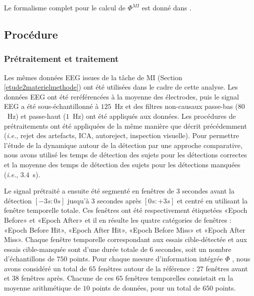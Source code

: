 Le formalisme complet pour le calcul de $\Phi^{MI}$ est donné dans \cite{kitazono2018efficient}. 

\subsection{Procédure}
\label{procedureiit}

\subsubsection{Prétraitement et traitement}
\label{pretraitementiit}

Les mêmes données EEG issues de la tâche de MI (Section \ref{etude2materielmethode}) ont été utilisées dans le cadre de cette analyse. 
Les données EEG ont été reréférencées à la moyenne des électrodes, puis le signal EEG a été sous-échantillonné à $125$~Hz et des filtres non-causaux passe-bas ($80$~Hz) et passe-haut ($1$~Hz) ont été appliqués aux données. 
Les procédures de prétraitements ont été appliquées de la même manière que décrit précédemment (\textit{i.e.}, rejet des artefacts, ICA, autoreject, inspection visuelle). 
Pour permettre l'étude de la dynamique autour de la détection par une approche comparative, nous avons utilisé les temps de détection des sujets pour les détections correctes et la moyenne des temps de détection des sujets pour les 
détections manquées (\textit{i.e.}, $3.4$~s).

Le signal prétraité a ensuite été segmenté en fenêtres de $3$ secondes avant la détection $[-3s:0s]$ jusqu'à $3$ secondes après $[0s:+3s]$ et centré en utilisant la fenêtre temporelle totale. 
Ces fenêtres ont été respectivement étiquetées «Epoch Before» et «Epoch After» et il en résulte les quatre catégories de fenêtres : «Epoch Before Hit», «Epoch After Hit», «Epoch Before Miss» et «Epoch After Miss». 
Chaque fenêtre temporelle correspondant aux essais cible-détectée et aux essais cible-manquée sont d'une durée totale de $6$ secondes, soit un nombre d'échantillons de $750$ points. 
Pour chaque mesure d'information intégrée $\Phi$ , nous avons considéré un total de $65$ fenêtres autour de la référence : $27$ fenêtres avant et $38$ fenêtres après. 
Chacune de ces $65$ fenêtres temporelles consistait en la moyenne arithmétique de $10$ points de données, pour un total de $650$ points. 

